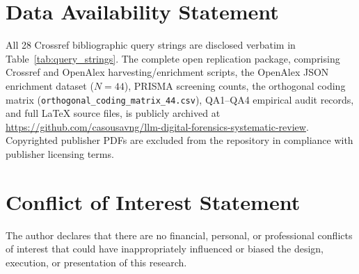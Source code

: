 \documentclass[journal]{IEEEtran}
\begin{document}










\section*{Data Availability Statement}
All 28 Crossref bibliographic query strings are disclosed verbatim in Table~\ref{tab:query_strings}. The complete open replication package, comprising Crossref and OpenAlex harvesting/enrichment scripts, the OpenAlex JSON enrichment dataset ($N=44$), PRISMA screening counts, the orthogonal coding matrix (\texttt{orthogonal\_coding\_matrix\_44.csv}), QA1--QA4 empirical audit records, and full LaTeX source files, is publicly archived at \url{https://github.com/casousavng/llm-digital-forensics-systematic-review}. Copyrighted publisher PDFs are excluded from the repository in compliance with publisher licensing terms.

\section*{Conflict of Interest Statement}
The author declares that there are no financial, personal, or professional conflicts of interest that could have inappropriately influenced or biased the design, execution, or presentation of this research.



\end{document}
